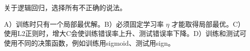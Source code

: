 关于逻辑回归，选择所有不正确的说法。


A）训练时只有一个局部最优解。B）必须固定学习率 \(\eta\) 才能取得局部最优。C）使用L2正则时，增大C会使训练错误率上升、测试错误率下降。D）训练和测试可使用不同的决策函数，例如训练用sigmoid、测试用sign。

